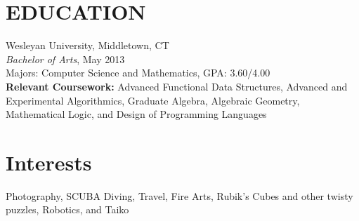 \documentclass[11pt]{res} %
\begin{document}
\begin{resume}
%

%

\section{EDUCATION}
 \noindent Wesleyan University, Middletown, CT \\
{\it Bachelor of Arts}, May 2013 \\
Majors: Computer Science and Mathematics, GPA: 3.60/4.00 \\
{\bf Relevant Coursework:} Advanced Functional Data Structures, Advanced and
Experimental Algorithmics, Graduate Algebra, Algebraic Geometry, Mathematical
Logic, and Design of Programming Languages


\section{Interests}
Photography, SCUBA Diving, Travel, Fire Arts, Rubik's Cubes and other twisty
puzzles, Robotics, and Taiko

\end{resume}
\end{document}
